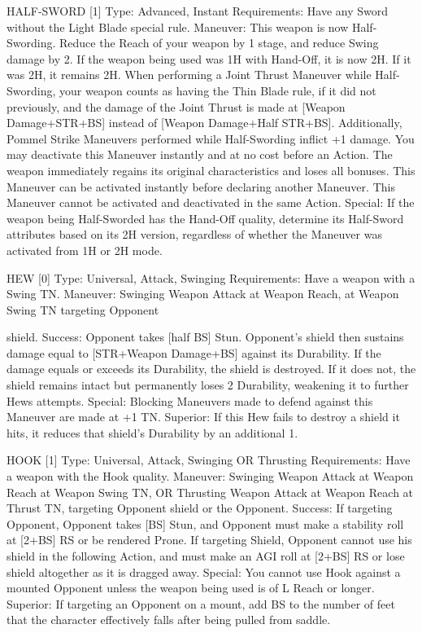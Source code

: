 \documentclass[oneside,11pt,english]{book}
\begin{document}
 

HALF-SWORD [1] 
Type: Advanced, Instant 
Requirements: Have any Sword without the Light Blade special rule. 
Maneuver: This weapon is now Half-Swording. Reduce the Reach of your weapon by 1 stage, and 
reduce Swing damage by 2. If the weapon being used was 1H with Hand-Off, it is now 2H. If it was 2H, 
it remains 2H. When performing a Joint Thrust Maneuver while Half-Swording, your weapon counts as 
having the Thin Blade rule, if it did not previously, and the damage of the Joint Thrust is made at 
[Weapon Damage+STR+BS] instead of [Weapon Damage+Half STR+BS]. Additionally, Pommel Strike 
Maneuvers performed while Half-Swording inflict +1 damage. 
You may deactivate this Maneuver instantly and at no cost before an Action. The weapon immediately 
regains its original characteristics and loses all bonuses. 
This Maneuver can be activated instantly before declaring another Maneuver. 
This Maneuver cannot be activated and deactivated in the same Action. 
Special: If the weapon being Half-Sworded has the Hand-Off quality, determine its Half-Sword attributes 
based on its 2H version, regardless of whether the Maneuver was activated from 1H or 2H mode. 

 

HEW [0] 
Type: Universal, Attack, Swinging 
Requirements: Have a weapon with a Swing TN. 
Maneuver: Swinging Weapon Attack at Weapon Reach, at Weapon Swing TN targeting Opponent 


shield. 
Success: Opponent takes [half BS] Stun. Opponent’s shield then sustains damage equal to [STR+Weapon 
Damage+BS] against its Durability. If the damage equals or exceeds its Durability, the shield is 
destroyed. If it does not, the shield remains intact but permanently loses 2 Durability, weakening it to 
further Hews attempts. 
Special: Blocking Maneuvers made to defend against this Maneuver are made at +1 TN. 
Superior: If this Hew fails to destroy a shield it hits, it reduces that shield’s Durability by an additional 1. 

 

HOOK [1] 
Type: Universal, Attack, Swinging OR Thrusting 
Requirements: Have a weapon with the Hook quality. 
Maneuver: Swinging Weapon Attack at Weapon Reach at Weapon Swing TN, OR Thrusting Weapon 
Attack at Weapon Reach at Thrust TN, targeting Opponent shield or the Opponent. 
Success: If targeting Opponent, Opponent takes [BS] Stun, and Opponent must make a stability roll at 
[2+BS] RS or be rendered Prone. 
If targeting Shield, Opponent cannot use his shield in the following Action, and must make an AGI roll at 
[2+BS] RS or lose shield altogether as it is dragged away. 
Special: You cannot use Hook against a mounted Opponent unless the weapon being used is of L Reach 
or longer. 
Superior: If targeting an Opponent on a mount, add BS to the number of feet that the character 
effectively falls after being pulled from saddle. 
\end{document}
